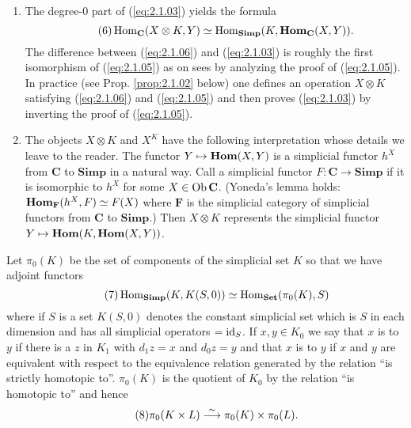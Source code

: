 \documentclass[../main]{subfiles}
\begin{document}
\begin{remarks*}\phantom{}
\begin{enumerate}
    \item The degree-0 part of (\ref{eq:2.1.03}) yields the formula 
    \begin{equation}\tag{6}
    \label{eq:2.1.06}
        \operatorname{Hom}_{\mathbf C}(X \otimes K, Y) \simeq \operatorname{Hom}_{\mathbf{Simp}}(K, \operatorname{\mathbf{Hom}}_{\mathbf C}(X, Y)).
    \end{equation}
    The difference between (\ref{eq:2.1.06}) and (\ref{eq:2.1.03}) is roughly the first isomorphism of (\ref{eq:2.1.05}) as on sees by analyzing the proof of (\ref{eq:2.1.05}). In practice (see Prop. \ref{prop:2.1.02} below) one defines an operation $X \otimes K$ satisfying (\ref{eq:2.1.06}) and (\ref{eq:2.1.05}) and then proves (\ref{eq:2.1.03}) by inverting the proof of (\ref{eq:2.1.05}).
    \item The objects $X \otimes K$ and $X^K$ have the following interpretation whose details we leave to the reader. The functor $Y \mapsto \operatorname{\mathbf{Hom}}(X, Y)$ is a simplicial functor $h^X$ from $\mathbf C$ to $\mathbf{Simp}$ in a natural way. Call a simplicial functor $F \colon \mathbf C \longrightarrow \mathbf{Simp}$  if it is isomorphic to $h^X$ for some $X \in \operatorname{Ob} \mathbf C$. (Yoneda's lemma holds: $\operatorname{\mathbf{Hom}}_{\mathbf F}(h^X, F) \simeq F(X)$ where $\mathbf F$ is the simplicial category of simplicial functors from $\mathbf C$ to $\mathbf{Simp}$.) Then $X \otimes K$ represents the simplicial functor $Y \mapsto \operatorname{\mathbf{Hom}}(K, \operatorname{\mathbf{Hom}}(X, Y))$.
\end{enumerate}
\end{remarks*}

Let $\pi_0(K)$ be the set of components of the simplicial set $K$ so that we have adjoint functors 
\begin{equation}\tag{7}
\label{eq:2.1.07}
    \operatorname{Hom}_{\mathbf{Simp}}(K, K(S, 0)) \simeq \operatorname{Hom}_{\mathbf{Set}} (\pi_0(K), S)
\end{equation}
where if $S$ is a set $K(S, 0)$ denotes the constant simplicial set which is $S$ in each dimension and has all simplicial operators $= \operatorname{id}_S$. If $x, y \in K_0$ we say that $x$ is  to $y$ if there is a $z$ in $K_1$ with $d_1 z = x$ and $d_0 z = y$ and that $x$ is  to $y$ if $x$ and $y$ are equivalent with respect to the equivalence relation generated by the relation ``is strictly homotopic to''. $\pi_0(K)$ is the quotient of $K_0$ by the relation ``is homotopic to'' and hence 
\begin{equation}\tag{8}
\label{eq:2.1.08}
    \pi_0(K \times L) \varrightarrow \sim \pi_0(K) \times \pi_0(L).
\end{equation}
\end{document}
